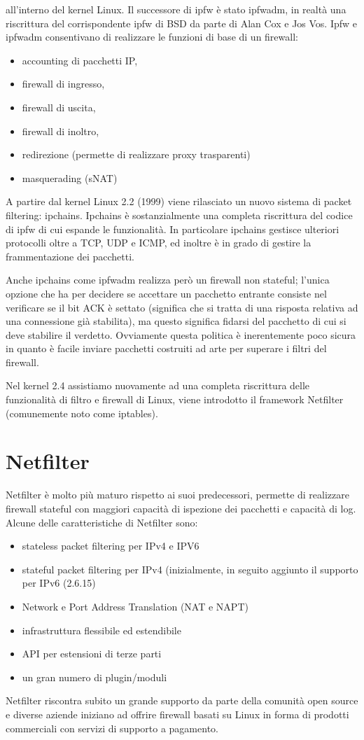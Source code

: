 all'interno del kernel Linux. Il successore di ipfw è
stato ipfwadm, in realtà una riscrittura del corrispondente ipfw
di BSD da parte di Alan Cox e Jos Vos.
Ipfw e ipfwadm consentivano di realizzare le funzioni di base di un firewall:
\begin{itemize}
    \item accounting di pacchetti IP,
    \item firewall di ingresso,
    \item firewall di uscita,
    \item firewall di inoltro,
    \item redirezione (permette di realizzare proxy trasparenti)
    \item masquerading (sNAT)
\end{itemize}
A partire dal kernel Linux 2.2 (1999) viene rilasciato un nuovo sistema di packet
filtering: ipchains. Ipchains \`e sostanzialmente una completa
riscrittura del codice di ipfw di cui espande le funzionalità.  In particolare
ipchains gestisce ulteriori protocolli oltre a TCP, UDP e ICMP, ed inoltre è
in grado di gestire la frammentazione dei pacchetti.

Anche ipchains come ipfwadm realizza però un firewall non stateful; l'unica
opzione che ha per decidere se accettare un pacchetto entrante consiste nel
verificare se il bit ACK \`e settato (significa che si tratta di una risposta
relativa ad una connessione già stabilita), ma questo significa fidarsi del
pacchetto di cui si deve stabilire il verdetto.  Ovviamente questa politica è
inerentemente poco sicura in quanto è facile inviare pacchetti costruiti ad
arte per superare i filtri del firewall.

Nel kernel 2.4 assistiamo nuovamente ad una completa riscrittura delle
funzionalità di filtro e firewall di Linux, viene introdotto il framework 
Netfilter (comunemente noto come iptables).

\section{Netfilter}
Netfilter è molto più maturo rispetto ai suoi predecessori, permette di
realizzare firewall stateful con maggiori capacità di ispezione dei pacchetti
e capacità di log.
Alcune delle caratteristiche di Netfilter sono:

\begin{itemize}
    \item stateless packet filtering per IPv4 e IPV6
    \item stateful packet filtering per IPv4 (inizialmente, in seguito
        aggiunto il supporto per IPv6 (2.6.15)
    \item Network e Port Address Translation (NAT e NAPT)
    \item infrastruttura flessibile ed estendibile
    \item API per estensioni di terze parti
    \item un gran numero di plugin/moduli
\end{itemize}
Netfilter riscontra subito un grande supporto da parte della comunità open
source e diverse aziende iniziano ad offrire firewall basati su Linux in forma
di prodotti commerciali con servizi di supporto a pagamento.

